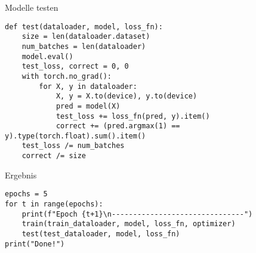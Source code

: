 
\begin{frame}[fragile]{Modelle testen}
\begin{lstlisting}
def test(dataloader, model, loss_fn):
    size = len(dataloader.dataset)
    num_batches = len(dataloader)
    model.eval()
    test_loss, correct = 0, 0
    with torch.no_grad():
        for X, y in dataloader:
            X, y = X.to(device), y.to(device)
            pred = model(X)
            test_loss += loss_fn(pred, y).item()
            correct += (pred.argmax(1) == y).type(torch.float).sum().item()
    test_loss /= num_batches
    correct /= size
\end{lstlisting}
\end{frame}


\begin{frame}[fragile]{Ergebnis}
\begin{lstlisting}
epochs = 5
for t in range(epochs):
    print(f"Epoch {t+1}\n-------------------------------")
    train(train_dataloader, model, loss_fn, optimizer)
    test(test_dataloader, model, loss_fn)
print("Done!")
\end{lstlisting}
\end{frame}

